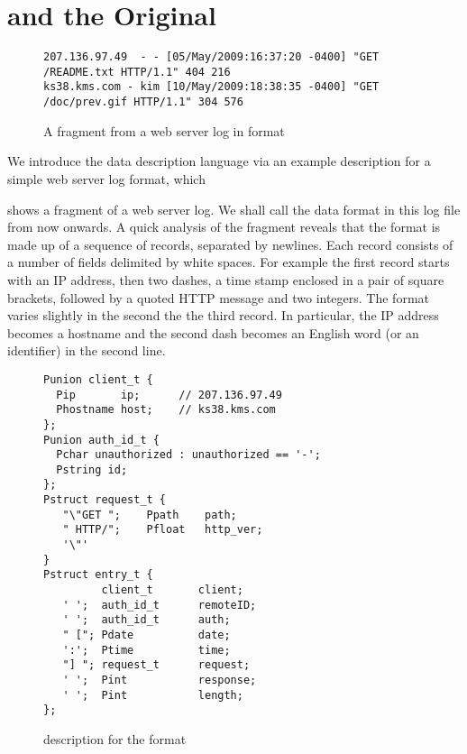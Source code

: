 \section{\pads{} and the Original \learnpads{}} 
\label{sec:review}

\begin{figure*}[th]
{\small \begin{verbatim}
207.136.97.49  - - [05/May/2009:16:37:20 -0400] "GET /README.txt HTTP/1.1" 404 216
ks38.kms.com - kim [10/May/2009:18:38:35 -0400] "GET /doc/prev.gif HTTP/1.1" 304 576 
\end{verbatim}                  
}
\caption{A fragment from a web server log in \ai{} format}
\label{fig:ai}
\end{figure*}

We introduce the \pads{} data description language via an example
description for a simple web server log format, which 

 shows a fragment of a web server
log. We shall call the data format 
in this log file \ai{} from now onwards. A quick analysis of the fragment reveals
that the \ai{} format is made up of a sequence of records, separated by newlines.
Each record consists of a number of fields delimited by white spaces. For example
the first record starts with an IP address, then two dashes, a time stamp enclosed in
a pair of square brackets, followed by a quoted HTTP message and two integers.
The format varies slightly in the second the the third record. In particular,
the IP address becomes a hostname and the second dash becomes an English word 
(or an identifier) in the second line. 

\begin{figure}[t]
{\small \begin{verbatim}
Punion client_t {
  Pip       ip;      // 207.136.97.49
  Phostname host;    // ks38.kms.com
};
Punion auth_id_t {
  Pchar unauthorized : unauthorized == '-'; 
  Pstring id;                        
};
Pstruct request_t {
   "\"GET ";    Ppath    path;
   " HTTP/";    Pfloat   http_ver; 
   '\"'
}
Pstruct entry_t {
         client_t       client;          
   ' ';  auth_id_t      remoteID;        
   ' ';  auth_id_t      auth;            
   " ["; Pdate          date;   
   ':';  Ptime          time;     
   "] "; request_t      request;         
   ' ';  Pint           response;     
   ' ';  Pint           length; 
};
\end{verbatim}
}
\caption{\padsc{} description for the \ai{} format}
\label{fig:ai.p}
\end{figure}

